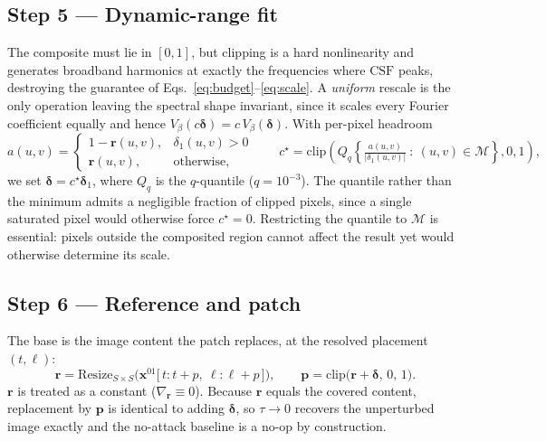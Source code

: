 \subsection{Step 5 — Dynamic-range fit \hfill{\normalfont[novel]}}

The composite must lie in $[0,1]$, but clipping is a hard nonlinearity
and generates broadband harmonics at exactly the frequencies where
$\mathrm{CSF}$ peaks, destroying the guarantee of
Eqs.~\eqref{eq:budget}--\eqref{eq:scale}. A \emph{uniform} rescale is
the only operation leaving the spectral shape invariant, since it scales
every Fourier coefficient equally and hence
$V_\beta(c\boldsymbol{\delta})=c\,V_\beta(\boldsymbol{\delta})$.
With per-pixel headroom
\begin{equation}
  a(u,v)=\begin{cases}
    1-\mathbf{r}(u,v), & \delta_1(u,v)>0\\
    \mathbf{r}(u,v),   & \text{otherwise,}
  \end{cases}
  \qquad
  c^{\star}=\mathrm{clip}\!\left(
  Q_q\!\left\{\tfrac{a(u,v)}{|\delta_1(u,v)|}\ :\ (u,v)\in\mathcal{M}\right\},0,1\right),
  \label{eq:fit}
\end{equation}
we set $\boldsymbol{\delta}=c^{\star}\boldsymbol{\delta}_1$, where $Q_q$
is the $q$-quantile ($q=10^{-3}$). The quantile rather than the minimum
admits a negligible fraction of clipped pixels, since a single saturated
pixel would otherwise force $c^{\star}=0$. Restricting the quantile to
$\mathcal{M}$ is essential: pixels outside the composited region cannot
affect the result yet would otherwise determine its scale.

\subsection{Step 6 — Reference and patch}

The base is the image content the patch replaces, at the resolved
placement $(t,\ell)$:
\begin{equation}
  \mathbf{r}=\mathrm{Resize}_{S\times S}
  \Big(\mathbf{x}^{01}\big[\,t:t{+}p,\ \ell:\ell{+}p\,\big]\Big),
  \qquad
  \mathbf{p}=\mathrm{clip}\big(\mathbf{r}+\boldsymbol{\delta},\,0,\,1\big).
  \label{eq:patch}
\end{equation}
$\mathbf{r}$ is treated as a constant ($\nabla_{\mathbf{r}}\equiv0$).
Because $\mathbf{r}$ equals the covered content, replacement by
$\mathbf{p}$ is identical to adding $\boldsymbol{\delta}$, so
$\tau\to0$ recovers the unperturbed image exactly and the
no-attack baseline is a no-op by construction.

